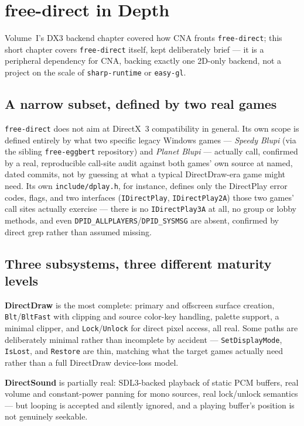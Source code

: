 \chapter{free-direct in Depth}
\label{ch:freedirect-deep-dive}

Volume~I's DX3 backend chapter covered how CNA fronts \texttt{free-direct}; this short
chapter covers \texttt{free-direct} itself, kept deliberately brief --- it is a peripheral
dependency for CNA, backing exactly one 2D-only backend, not a project on the scale of
\texttt{sharp-runtime} or \texttt{easy-gl}.

\section{A narrow subset, defined by two real games}

\texttt{free-direct} does not aim at DirectX~3 compatibility in general. Its own scope is
defined entirely by what two specific legacy Windows games --- \emph{Speedy Blupi} (via the
sibling \texttt{free-eggbert} repository) and \emph{Planet Blupi} --- actually call, confirmed
by a real, reproducible call-site audit against both games' own source at named, dated
commits, not by guessing at what a typical DirectDraw-era game might need. Its own
\texttt{include/dplay.h}, for instance, defines only the DirectPlay error codes, flags, and
two interfaces (\texttt{IDirectPlay}, \texttt{IDirectPlay2A}) those two games' call sites
actually exercise --- there is no \texttt{IDirectPlay3A} at all, no group or lobby methods,
and even \texttt{DPID\_ALLPLAYERS}/\texttt{DPID\_SYSMSG} are absent, confirmed by direct grep
rather than assumed missing.

\section{Three subsystems, three different maturity levels}

\textbf{DirectDraw} is the most complete: primary and offscreen surface creation,
\texttt{Blt}/\texttt{BltFast} with clipping and source color-key handling, palette support,
a minimal clipper, and \texttt{Lock}/\texttt{Unlock} for direct pixel access, all real. Some
paths are deliberately minimal rather than incomplete by accident ---
\texttt{SetDisplayMode}, \texttt{IsLost}, and \texttt{Restore} are thin, matching what the
target games actually need rather than a full DirectDraw device-loss model.

\textbf{DirectSound} is partially real: SDL3-backed playback of static PCM buffers, real
volume and constant-power panning for mono sources, real lock/unlock semantics --- but
looping is accepted and silently ignored, and a playing buffer's position is not genuinely
seekable.


